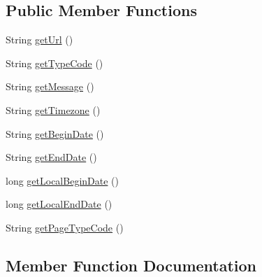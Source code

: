 \subsection*{Public Member Functions}
\begin{DoxyCompactItemize}
\item 
String \hyperlink{classcom_1_1toast_1_1android_1_1gamebase_1_1launching_1_1data_1_1_launching_maintenance_info_ad2ea28664c7db5089385e62816477d28}{get\+Url} ()
\item 
String \hyperlink{classcom_1_1toast_1_1android_1_1gamebase_1_1launching_1_1data_1_1_launching_maintenance_info_ac19e869ea7bb3cac88894ee3b805db79}{get\+Type\+Code} ()
\item 
String \hyperlink{classcom_1_1toast_1_1android_1_1gamebase_1_1launching_1_1data_1_1_launching_maintenance_info_afafd068b736520af1e24269a284980a9}{get\+Message} ()
\item 
String \hyperlink{classcom_1_1toast_1_1android_1_1gamebase_1_1launching_1_1data_1_1_launching_maintenance_info_aa33855f8c09210d287f7be5606a77e87}{get\+Timezone} ()
\item 
String \hyperlink{classcom_1_1toast_1_1android_1_1gamebase_1_1launching_1_1data_1_1_launching_maintenance_info_a842dfe5c51315c0403eecf42c5061c90}{get\+Begin\+Date} ()
\item 
String \hyperlink{classcom_1_1toast_1_1android_1_1gamebase_1_1launching_1_1data_1_1_launching_maintenance_info_aab584c35eba513c525208208dd4c6c7f}{get\+End\+Date} ()
\item 
long \hyperlink{classcom_1_1toast_1_1android_1_1gamebase_1_1launching_1_1data_1_1_launching_maintenance_info_aa422a33aa06c8e9a8a73d615143e0c3b}{get\+Local\+Begin\+Date} ()
\item 
long \hyperlink{classcom_1_1toast_1_1android_1_1gamebase_1_1launching_1_1data_1_1_launching_maintenance_info_a785ee5beb5bb148aa6d1dcdeea0817bb}{get\+Local\+End\+Date} ()
\item 
String \hyperlink{classcom_1_1toast_1_1android_1_1gamebase_1_1launching_1_1data_1_1_launching_maintenance_info_aa325f229a38ffe1161d3cbf7ed32e396}{get\+Page\+Type\+Code} ()
\end{DoxyCompactItemize}


\subsection{Member Function Documentation}
\mbox{\label{classcom_1_1toast_1_1android_1_1gamebase_1_1launching_1_1data_1_1_launching_maintenance_info_a842dfe5c51315c0403eecf42c5061c90}} 
